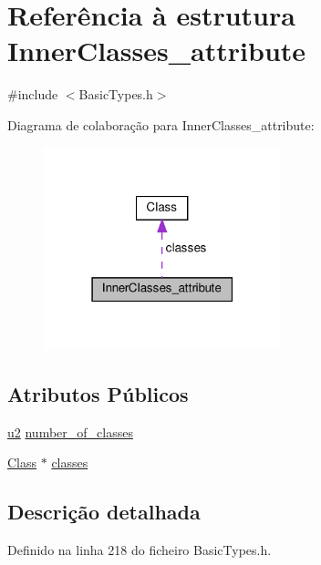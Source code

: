 \hypertarget{structInnerClasses__attribute}{}\section{Referência à estrutura Inner\+Classes\+\_\+attribute}
\label{structInnerClasses__attribute}


{\ttfamily \#include $<$Basic\+Types.\+h$>$}



Diagrama de colaboração para Inner\+Classes\+\_\+attribute\+:\nopagebreak
\begin{figure}[H]
\begin{center}
\leavevmode
\includegraphics[width=195pt]{structInnerClasses__attribute__coll__graph}
\end{center}
\end{figure}
\subsection*{Atributos Públicos}
\begin{DoxyCompactItemize}
\item 
\hyperlink{BasicTypes_8h_a732cde1300aafb73b0ea6c2558a7a54f}{u2} \hyperlink{structInnerClasses__attribute_ae1ab3ffc94d37479a2f58cb801674191}{number\+\_\+of\+\_\+classes}
\item 
\hyperlink{structClass}{Class} $\ast$ \hyperlink{structInnerClasses__attribute_ab9d6da51f62c9886a96d40719c81b103}{classes}
\end{DoxyCompactItemize}


\subsection{Descrição detalhada}


Definido na linha 218 do ficheiro Basic\+Types.\+h.



